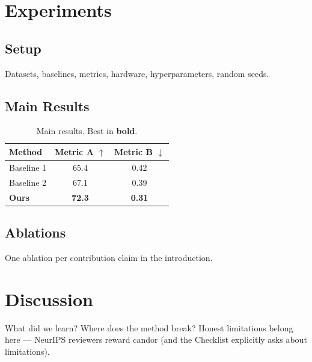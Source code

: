 \documentclass{article}
\begin{document}
\section{Experiments}
\label{sec:exp}

\subsection{Setup}
Datasets, baselines, metrics, hardware, hyperparameters, random seeds.

\subsection{Main Results}
\begin{table}[t]
\centering
\caption{Main results. Best in \textbf{bold}.}
\label{tab:main}
\begin{tabular}{lcc}
\toprule
Method & Metric A $\uparrow$ & Metric B $\downarrow$ \\
\midrule
Baseline 1 & 65.4 & 0.42 \\
Baseline 2 & 67.1 & 0.39 \\
\textbf{Ours} & \textbf{72.3} & \textbf{0.31} \\
\bottomrule
\end{tabular}
\end{table}

\subsection{Ablations}
One ablation per contribution claim in the introduction.


\section{Discussion}
\label{sec:discussion}

What did we learn? Where does the method break? Honest limitations belong
here — NeurIPS reviewers reward candor (and the Checklist explicitly asks
about limitations).

\end{document}
